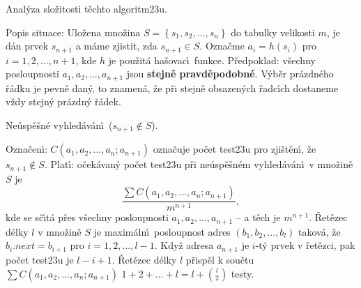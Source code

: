 \subhead
Anal\'yza slo\v zitosti t\v echto algoritm\accent23u.
\endsubhead
\smallskip

\flushpar Popis situace: Ulo\v zena mno\v zina 
$S=\left\{s_1,s_2,\dots,s_n\right\}$ do ta\-bulky velikosti $m$, je d\'an 
prvek $s_{n+1}$ a m\'ame zjistit, zda $s_{n+1}\in S$. Ozna\v cme 
$a_i=h\left(s_i\right)$ pro $i=1,2,\dots,n+1$, kde $h$ je pou\v zit\'a ha\v sovac\'\i\ 
funkce.\newline 
P\v redpoklad: v\v sechny posloupnosti $a_1,a_2,\dots,a_{n+1}$ jsou 
{\bf stejn\v e pravd\v epodobn\'e}. V\'yb\v er pr\'azdn\'eho \v r\'adku je 
pevn\v e dan\'y, to znamen\'a, \v ze p\v ri stejn\v e obsazen\'ych 
\v radc\'\i ch dostaneme v\v zdy stejn\'y pr\'azdn\'y \v r\'adek.  
\medskip

\subhead
Ne\'usp\v e\v sn\'e vyhled\'av\'an\'\i\ ($s_{n+1}\notin S$). 
\endsubhead
\smallskip

\flushpar Ozna\v cen\'\i : $C\left(a_1,a_2,\dots,a_n;a_{n+1}\right)$ ozna\v cuje po\v cet 
test\accent23u pro zji\v s\-t\v en\'\i , \v ze $s_{n+1}\notin S$. Plat\'\i : 
o\v cek\'avan\'y po\v cet test\accent23u p\v ri 
ne\'usp\v e\v sn\'em vy\-hled\'av\'an\'\i\ v mno\v zin\v e $S$ je 
$$\frac {\sum C\left(a_1,a_2,\dots,a_n;a_{n+1}\right)}{m^{n+1}},$$
kde se s\v c\'\i t\'a p\v res v\v sechny posloupnosti $a_1,a_2,\dots
,a_{n+1}$ -- 
a t\v ech je $m^{n+1}$. \newline 
\v Ret\v ezec d\'elky $l$ v mno\v zin\v e $S$ je maxim\'aln\'\i\ posloupnost 
adres $\left(b_1,b_2,\dots,b_l\right)$ takov\'a, \v ze $b_i.next=b_{i+1}$ pro 
$i=1,2,\dots,l-1$.
Kdy\v z adresa $a_{n+1}$ je $i$-t\'y prvek v \v ret\v ezci, pak po\v cet 
test\accent23u je $l-i+1$. \v Ret\v ezec d\'elky $l$ p\v risp\v el k sou\v ctu 
$\sum C\left(a_1,a_2,\dots,a_n;a_{n+1}\right)$ $1+2+\dots+l=l+\binom l2$ testy. 

